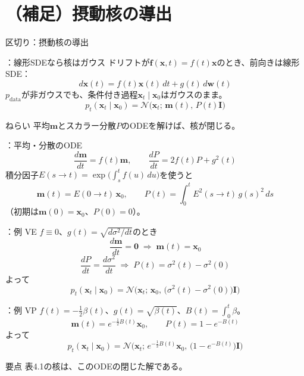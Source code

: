 \section{（補足）摂動核の導出}
\assuppl
\begin{frame}{区切り：\supplmark\;摂動核の導出}
    \tableofcontents[currentsection]
\end{frame}
\assuppl
\begin{frame}{\supplmark：線形SDEなら核はガウス}
    ドリフトが$\bm{f}(\bm{x},t)=f(t)\bm{x}$のとき、前向きは線形SDE：
    \[
        d\bm{x}(t)=f(t)\bm{x}(t)\,dt+g(t)\,d\bm{w}(t)
    \]
    $p_{\mathrm{data}}$が非ガウスでも、条件付き過程$\bm{x}_t\mid\bm{x}_0$はガウスのまま。
    \[
        p_t(\bm{x}_t\mid\bm{x}_0)
        =
        \mathcal{N}\bigl(\bm{x}_t;\,\bm{m}(t),\,P(t)\bm{I}\bigr)
    \]
    \begin{exampleblock}{ねらい}
        平均$\bm{m}$とスカラー分散$P$のODEを解けば、核が閉じる。
    \end{exampleblock}
\end{frame}
\assuppl
\begin{frame}{\supplmark：平均・分散のODE}
    \[
        \dfrac{d\bm{m}}{dt}=f(t)\bm{m},
        \qquad
        \dfrac{dP}{dt}=2f(t)P+g^{2}(t)
        \tag{4.4.3}
    \]
    積分因子$E(s\to t)=\exp\bigl(\int_s^t f(u)\,du\bigr)$を使うと
    \[
        \bm{m}(t)=E(0\to t)\,\bm{x}_0,
        \qquad
        P(t)=\int_0^t E^{2}(s\to t)\,g(s)^{2}\,ds
        \tag{4.4.4}
    \]
    （初期は$\bm{m}(0)=\bm{x}_0$、$P(0)=0$）。
\end{frame}
\assuppl
\begin{frame}{\supplmark：例 VE}
    $f\equiv 0$、$g(t)=\sqrt{d\sigma^{2}/dt}$のとき
    \[
        \dfrac{d\bm{m}}{dt}=\bm{0}
        \;\Rightarrow\;
        \bm{m}(t)=\bm{x}_0
    \]
    \[
        \dfrac{dP}{dt}=\dfrac{d\sigma^{2}}{dt}
        \;\Rightarrow\;
        P(t)=\sigma^{2}(t)-\sigma^{2}(0)
    \]
    よって
    \[
        p_t(\bm{x}_t\mid\bm{x}_0)
        =
        \mathcal{N}\!\bigl(
            \bm{x}_t;\,\bm{x}_0,\,
            \bigl(\sigma^{2}(t)-\sigma^{2}(0)\bigr)\bm{I}
        \bigr)
    \]
\end{frame}
\assuppl
\begin{frame}{\supplmark：例 VP}
    $f(t)=-\tfrac12\beta(t)$、$g(t)=\sqrt{\beta(t)}$、$B(t)=\int_0^t\beta$。
    \[
        \bm{m}(t)=e^{-\frac12 B(t)}\bm{x}_0,
        \qquad
        P(t)=1-e^{-B(t)}
    \]
    よって
    \[
        p_t(\bm{x}_t\mid\bm{x}_0)
        =
        \mathcal{N}\!\bigl(
            \bm{x}_t;\,
            e^{-\frac12 B(t)}\bm{x}_0,\,
            \bigl(1-e^{-B(t)}\bigr)\bm{I}
        \bigr)
    \]
    \begin{exampleblock}{要点}
        表4.1の核は、このODEの閉じた解である。
    \end{exampleblock}
\end{frame}
